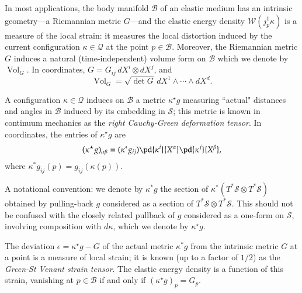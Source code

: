 \documentclass[smallextended]{svjour3}
\begin{document}
In most applications, the body manifold ${\mathcal{B}}$ of an elastic medium has an intrinsic geometry---a Riemannian metric $G$---and the elastic energy density ${\mathcal{W}}(j^1_p\kappa)$ is a measure of the local strain: it measures the local distortion induced by the current configuration $\kappa\in{\mathcal{Q}}$ at the point $p\in{\mathcal{B}}$. Moreover, the Riemannian metric $G$ induces a natural (time-independent) volume form on ${\mathcal{B}}$ which we denote by $\operatorname{Vol}_G$. In coordinates, $G = G_{ij}\, dX^i\otimes dX^j$, and 
\[
\operatorname{Vol}_{G} = \sqrt{\det G}\,dX^1\wedge\cdots \wedge dX^d.
\]

A configuration $\kappa\in{\mathcal{Q}}$ induces on ${\mathcal{B}}$ a metric $\kappa^\star g$ measuring ``actual" distances and angles in ${\mathcal{B}}$ induced by its embedding in ${\mathcal{S}}$; this metric is known in continuum mechanics as the \emph{right Cauchy-Green deformation tensor}. In coordinates, the entries of $\kappa^\star g$ are
\[
(\kappa^\star g)_{\alpha\beta}= (\kappa^*g_{ij})\pd{\kappa^i}{X^\alpha}\pd{\kappa^j}{X^\beta},
\] 
where $\kappa^*g_{ij}(p) = g_{ij}(\kappa(p))$. 

A notational convention: 
we denote by $\kappa^* g$
the section of $\kappa^*(T^*{\mathcal{S}}\otimes T^*{\mathcal{S}})$ obtained by pulling-back $g$ considered as a section of $T^*{\mathcal{S}}\otimes T^*{\mathcal{S}}$. This should not be confused with the closely related pullback of $g$ considered as a one-form on ${\mathcal{S}}$, involving composition with $d\kappa$, which we denote by $\kappa^\star g$.

The deviation $\epsilon = \kappa^\star g-G$ of the actual metric $\kappa^*g$ from the intrinsic metric $G$ at a point is a measure of local strain; it is known (up to a factor of $1/2$) as the \emph{Green-St Venant strain tensor}. The elastic energy density is a function of this strain, vanishing at $p\in{\mathcal{B}}$ if and only if $(\kappa^\star g)_p = G_p$.
\end{document}

